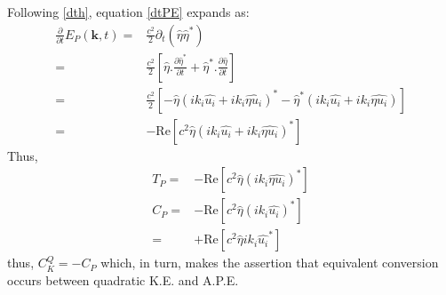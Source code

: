 \documentclass[a4paper,12pt]{paper}
\newcommand{\pder}[2][]{\frac{\partial#1}{\partial#2}}
\begin{document}
Following \eqref{dth}, equation \eqref{dtPE} expands as:
\begin{align*}
 \pder{t}E_P(\mathbf{k},t)
 =& \frac{c^2}{2}\partial_t({\hat \eta}{\hat \eta^*})\\
 =& \frac{c^2}{2}\left[ \hat{\eta} .\pder[\hat{\eta}^*]{t}+ \hat 
\eta^*.\pder[\hat \eta]{t}\right]\\
 =& \frac{c^2}{2}\left[ - \hat{\eta} (ik_i\hat{ u_i } + ik_i\widehat{ 
      \eta u_i })^*  
	    - \hat{\eta}^* (ik_i\hat{ u_i } + ik_i\widehat{ 
      \eta u_i })  \right]\\
      =& -\text{Re}\left[c^2\hat{\eta} (ik_i\hat{ u_i } + ik_i\widehat{ 
      \eta u_i })^* \right]
\end{align*}
Thus,
\begin{align}
T_P= & -\text{Re}\left[c^2\hat{\eta} (ik_i\widehat{ 
      \eta u_i })^*  \right]\\
C_P=&  -\text{Re}\left[c^2\hat{\eta} (ik_i\hat{u_i })^*\right]\\
   =&  +\text{Re}\left[c^2\hat{\eta} ik_i\hat{u_i }^*\right]
\end{align}
thus, $C^Q_K = -C_P$ which, in turn, makes the assertion that  
equivalent conversion occurs between quadratic K.E. and A.P.E.
% 
% 
% 
\end{document}
